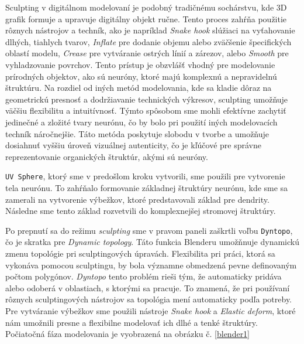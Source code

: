 Sculpting v digitálnom modelovaní je podobný tradičnému sochárstvu, kde 3D grafik formuje a upravuje digitálny objekt ručne. Tento proces zahŕňa použitie
rôznych nástrojov a techník, ako je napríklad \emph{Snake hook} slúžiaci na vyťahovanie dlhých, tiahlych tvarov, \emph{Inflate} pre dodanie objemu alebo zväčšenie špecifických oblastí modelu,
\emph{Crease} pre vytváranie ostrých línií a zárezov, alebo \emph{Smooth} pre vyhladzovanie povrchov. Tento prístup je obzvlášť vhodný pre modelovanie prírodných objektov, ako sú neuróny, 
ktoré majú komplexnú a nepravidelnú štruktúru. Na rozdiel od iných metód modelovania, kde sa kladie dôraz na geometrickú presnosť a dodržiavanie technických výkresov, sculpting umožňuje 
väčšiu flexibilitu a intuitívnosť. Týmto spôsobom sme mohli efektívne zachytiť jedinečné a zložité tvary neurónu, čo by bolo pri použití iných modelovacích techník náročnejšie. 
Táto metóda poskytuje slobodu v tvorbe a umožňuje dosiahnuť vyššiu úroveň vizuálnej autenticity, čo je kľúčové pre správne reprezentovanie organických štruktúr, akými sú neuróny.

\texttt{UV Sphere}, ktorý sme v predošlom kroku vytvorili, sme použili pre vytvorenie tela neurónu. To zahŕňalo formovanie základnej štruktúry neurónu, kde sme sa zamerali na vytvorenie
výbežkov, ktoré predstavovali základ pre dendrity. Následne sme tento základ rozvetvili do komplexnejšej stromovej štruktúry.

Po prepnutí sa do režimu \emph{sculpting} sme v pravom paneli zaškrtli voľbu \texttt{Dyntopo}, čo je skratka pre \emph{Dynamic topology}. Táto funkcia Blenderu umožňnuje dynamickú zmenu
topológie pri sculptingových úpravách. Flexibilita pri práci, ktorá sa vykonáva pomocou sculptingu, by bola významne obmedzená pevne definovaným počtom polygónov. \emph{Dyntopo} tento problém
rieši tým, že automaticky pridáva alebo odoberá v oblastiach, s ktorými sa pracuje. To znamená, že pri používaní rôznych sculptingových nástrojov sa topológia mení automaticky podľa potreby.
Pre vytváranie výbežkov sme použili nástroje \emph{Snake hook} a \emph{Elastic deform}, ktoré nám umožnili presne a flexibilne modelovať ich dlhé a tenké štruktúry. Počiatočná fáza modelovania
je vyobrazená na obrázku č. \ref{blender1}

